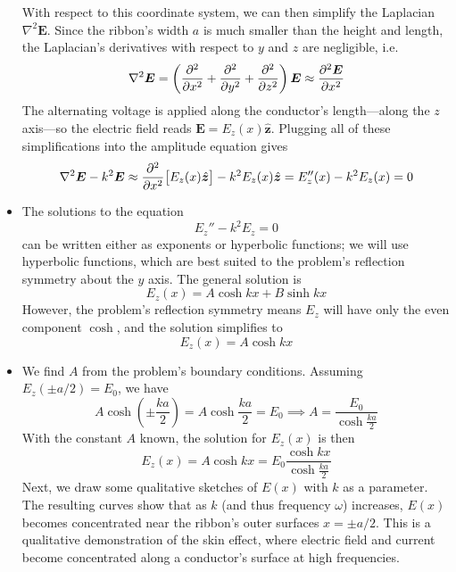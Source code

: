 \documentclass[11pt, a4paper]{article}
\renewcommand{\vec}[1]{\bm{#1}} %
\newcommand{\uvec}[1]{\hat{\vec{#1}}} %
\newcommand{\E}{\vec{E}}  %
\renewcommand{\laplacian}{\nabla^{2}}
\begin{document}
\begin{itemize}
	With respect to this coordinate system, we can then simplify the Laplacian $ \laplacian \E $. Since the ribbon's width $ a $ is much smaller than the height and length, the Laplacian's derivatives with respect to $ y $ and $ z $ are negligible, i.e.
	\begin{equation*}
		\laplacian \E = \left(\pdv[2]{}{x} + \pdv[2]{}{y} + \pdv[2]{}{z}\right)\E \approx \pdv[2]{\E}{x}
	\end{equation*}
	The alternating voltage is applied along the conductor's length---along the $ z $ axis---so the electric field reads $ \E = E_{z}(x) \uvec{z} $. Plugging all of these simplifications into the amplitude equation gives
	\begin{equation*}
		\laplacian \E - k^{2}\E \approx \pdv[2]{}{x} \big[E_{z}(x) \uvec{z}\big] - k^{2}E_{z}(x) \uvec{z} =   E_{z}''(x) - k^{2}E_{z}(x) = 0
	\end{equation*}
	\item The solutions to the equation 
	\begin{equation*}
		E_{z}'' - k^{2}E_{z} = 0
	\end{equation*}
	can be written either as exponents or hyperbolic functions; we will use hyperbolic functions, which are best suited to the problem's reflection symmetry about the $ y $ axis. The general solution is
	\begin{equation*}
		E_{z}(x) = A\cosh kx + B\sinh kx
	\end{equation*}
	However, the problem's reflection symmetry means $ E_{z} $ will have only the even component $ \cosh $, and the solution simplifies to
	\begin{equation*}
		E_{z}(x) = A\cosh kx
	\end{equation*}
	
	\item We find $ A $ from the problem's boundary conditions. Assuming $ E_{z}(\pm a/2) = E_{0} $, we have
	\begin{equation*}
		A \cosh \left(\pm \frac{ka}{2}\right) = A \cosh \frac{ka}{2} = E_{0} \implies A = \frac{E_{0}}{\cosh \frac{ka}{2}}
	\end{equation*} 
	With the constant $ A $ known, the solution for $ E_{z}(x) $ is then
	\begin{equation*}
		E_{z}(x) = A\cosh kx = E_{0}\frac{\cosh kx}{\cosh \frac{ka}{2}}
	\end{equation*}
	Next, we draw some qualitative sketches of $ E(x) $ with $ k $ as a parameter. The resulting curves show that as $ k $ (and thus frequency $ \omega $) increases, $ E(x) $ becomes concentrated near the ribbon's outer surfaces  $ x = \pm a/2 $. This is a qualitative demonstration of the skin effect, where electric field and current become concentrated along a conductor's surface at high frequencies.
\end{itemize}	
	
\end{document}
